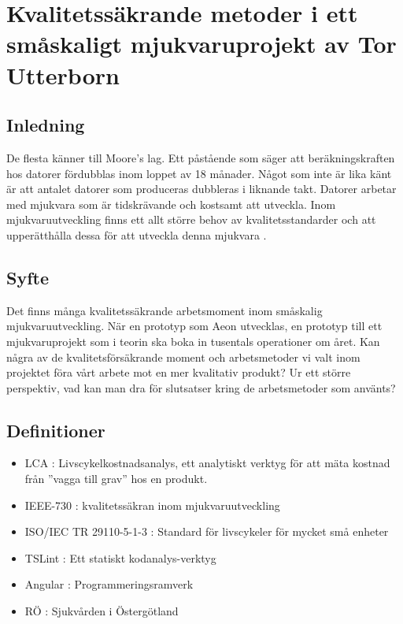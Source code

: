 \chapter{Kvalitetssäkrande metoder i ett småskaligt mjukvaruprojekt av Tor Utterborn}

\section{Inledning}

De flesta känner till Moore's lag. Ett påstående som säger att beräkningskraften hos datorer fördubblas inom loppet av 18 månader. 
Något som inte är lika känt är att antalet datorer som produceras dubbleras i liknande takt. \cite{greenbiz}
Datorer arbetar med mjukvara som är tidskrävande och kostsamt att utveckla. Inom mjukvaruutveckling finns ett allt större behov av kvalitetsstandarder och att upperätthålla dessa för att utveckla denna mjukvara \cite{linkedin}.

\section{Syfte}

Det finns många kvalitetssäkrande arbetsmoment inom småskalig mjukvaruutveckling. När en prototyp som Aeon utvecklas, en prototyp till ett mjukvaruprojekt som i teorin ska boka in tusentals operationer om året. Kan några av de kvalitetsförsäkrande moment och arbetsmetoder vi valt inom projektet föra vårt arbete mot en mer kvalitativ produkt? Ur ett större perspektiv, vad kan man dra för slutsatser kring de arbetsmetoder som använts?

\section{Definitioner}
\begin{itemize}
	\item LCA :  Livscykelkostnadsanalys, ett analytiskt verktyg för att mäta kostnad från ''vagga till grav'' hos en produkt.
	\item IEEE-730 : kvalitetssäkran inom mjukvaruutveckling
	\item ISO/IEC TR 29110-5-1-3 : Standard för livscykeler för mycket små enheter
	\item TSLint : Ett statiskt kodanalys-verktyg
	\item Angular : Programmeringsramverk
	\item RÖ : Sjukvården i Östergötland
\end{itemize}


